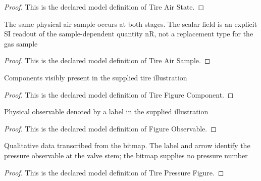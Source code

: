 \begin{proof}
  This is the declared model definition of Tire Air State.
\end{proof}
\begin{definition}
  \label{def:physics:phyx-mini-0399:phyxminiproblems-problemphyxmini0399-tireairsample}
  The same physical air sample occurs at both stages. The scalar field is an explicit SI readout of the sample-dependent quantity nR, not a replacement type for the gas sample
\end{definition}
\begin{proof}
  This is the declared model definition of Tire Air Sample.
\end{proof}
\begin{definition}
  \label{def:physics:phyx-mini-0399:phyxminiproblems-problemphyxmini0399-tirefigurecomponent}
  Components visibly present in the supplied tire illustration
\end{definition}
\begin{proof}
  This is the declared model definition of Tire Figure Component.
\end{proof}
\begin{definition}
  \label{def:physics:phyx-mini-0399:phyxminiproblems-problemphyxmini0399-figureobservable}
  Physical observable denoted by a label in the supplied illustration
\end{definition}
\begin{proof}
  This is the declared model definition of Figure Observable.
\end{proof}
\begin{definition}
  \label{def:physics:phyx-mini-0399:phyxminiproblems-problemphyxmini0399-tirepressurefigure}
  Qualitative data transcribed from the bitmap. The label and arrow identify the pressure observable at the valve stem; the bitmap supplies no pressure number
\end{definition}
\begin{proof}
  This is the declared model definition of Tire Pressure Figure.
\end{proof}
